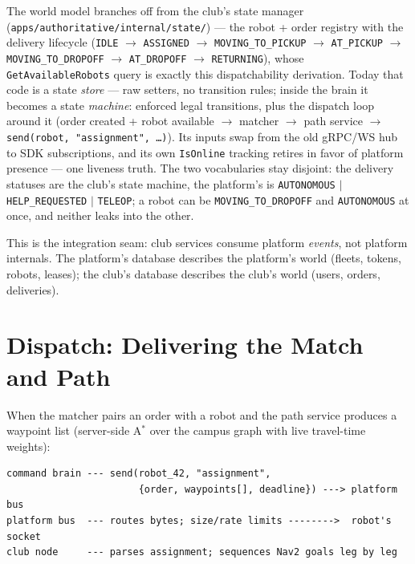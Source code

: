 \documentclass[11pt]{article}
\begin{document}
The world model branches off from the club's state manager
(\texttt{apps/authoritative/internal/state/}) --- the robot + order
registry with the delivery lifecycle (\texttt{IDLE} $\to$ \texttt{ASSIGNED} $\to$
\texttt{MOVING\_TO\_PICKUP} $\to$ \texttt{AT\_PICKUP} $\to$
\texttt{MOVING\_TO\_DROPOFF} $\to$ \texttt{AT\_DROPOFF} $\to$ \texttt{RETURNING}),
whose \texttt{GetAvailableRobots} query is exactly this dispatchability derivation.
Today that code is a state \emph{store} --- raw setters, no transition rules; inside
the brain it becomes a state \emph{machine}: enforced legal transitions, plus the
dispatch loop around it (order created + robot available $\to$ matcher $\to$ path
service $\to$ \texttt{send(robot, "assignment", \dots)}). Its inputs swap from the
old gRPC/WS hub to SDK subscriptions, and its own \texttt{IsOnline} tracking retires
in favor of platform presence --- one liveness truth. The two vocabularies stay
disjoint: the delivery statuses are the club's state machine, the platform's is
\texttt{AUTONOMOUS} $|$ \texttt{HELP\_REQUESTED} $|$ \texttt{TELEOP}; a robot can be
\texttt{MOVING\_TO\_DROPOFF} and \texttt{AUTONOMOUS} at once, and neither leaks into
the other.

This is the integration seam: club services consume platform \emph{events}, not
platform internals. The platform's database describes the platform's world (fleets,
tokens, robots, leases); the club's database describes the club's world (users, orders,
deliveries).

\section{Dispatch: Delivering the Match and Path}

When the matcher pairs an order with a robot and the path service produces a waypoint
list (server-side A$^{*}$ over the campus graph with live travel-time weights):

\begin{lstlisting}
command brain --- send(robot_42, "assignment",
                       {order, waypoints[], deadline}) ---> platform bus
platform bus  --- routes bytes; size/rate limits -------->  robot's socket
club node     --- parses assignment; sequences Nav2 goals leg by leg
\end{lstlisting}
\end{document}
